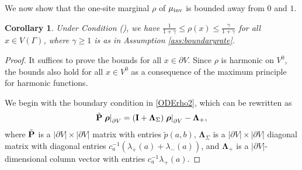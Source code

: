 \documentclass[11pt]{amsart}
\theoremstyle{plain}
\newtheorem{corollary}[lemma]{Corollary}
\theoremstyle{definition}
\theoremstyle{remark}
\begin{document}
We now show that the one-site marginal $\rho$ of $\mu_{\rm inv}$ is bounded away from $0$ and $1$.

\begin{corollary}
\label{cor:boundaryrate}
Under Condition (), we have 
$\frac{1}{1+\gamma} \leq \rho(x) \leq \frac{\gamma}{1+\gamma}$ for all $x\in V(\Gamma)$, where $\gamma\geq 1$ is as in Assumption \ref{ass:boundaryrate}.
\end{corollary}

\begin{proof}
It suffices to prove the bounds for all $x\in \partial V$. Since $\rho$ is harmonic on $V^0$, the bounds also hold for all $x\in V^0$ as a consequence of the maximum principle for harmonic functions.

We begin with the boundary condition in \eqref{ODErho2}, which can be rewritten as
\begin{align}
\label{P=I+Lambda}
\tilde{\bf P} \left.\boldsymbol \rho\right|_{\partial V} = \left({\bf I} + \boldsymbol\Lambda_{\Sigma}\right) \left.\boldsymbol \rho\right|_{\partial V} - \boldsymbol\Lambda_+,
\end{align}
where $\tilde{\bf P}$ is a $|\partial V|\times |\partial V|$ matrix with entries $\tilde{p}(a,b)$, $\boldsymbol\Lambda_\Sigma$ is a $|\partial V|\times |\partial V|$ diagonal matrix with diagonal entries $c_a^{-1} (\lambda_+(a) + \lambda_-(a))$, and $\boldsymbol\Lambda_+$ is a $|\partial V|$-dimensional column vector with entries $c_a^{-1} \lambda_+(a)$. 


\end{proof}
\end{document}
